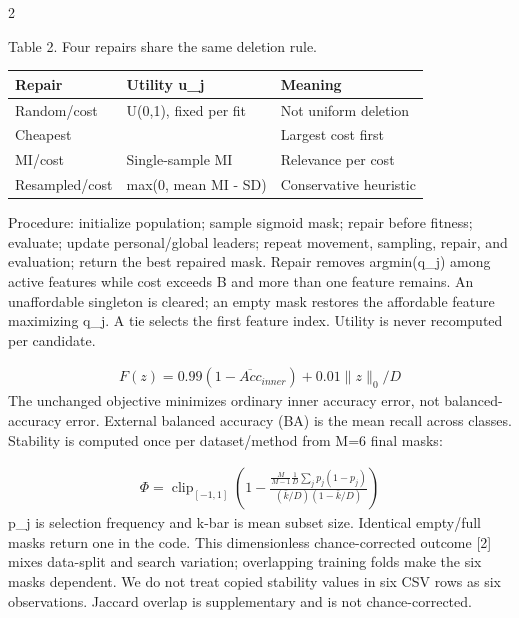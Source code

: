 \documentclass[10pt,a4paper]{article}
\begin{document}
\begin{multicols}{2}
\par\vspace{3pt}\begin{minipage}{\linewidth}{\footnotesize Table 2. Four repairs share the same deletion rule.\par}
{\fontsize{6.8}{8.3}\selectfont\setlength{\tabcolsep}{2pt}\renewcommand{\arraystretch}{1.1}
\begin{tabularx}{\linewidth}{>{\hsize=1.0000\hsize\raggedright\arraybackslash}X>{\hsize=1.0000\hsize\raggedright\arraybackslash}X>{\hsize=1.0000\hsize\raggedright\arraybackslash}X}\toprule
Repair & Utility u\_j & Meaning\\\midrule
Random/cost & U(0,1), fixed per fit & Not uniform deletion\\
Cheapest & 1 & Largest cost first\\
MI/cost & Single-sample MI & Relevance per cost\\
Resampled/cost & max(0, mean MI - SD) & Conservative heuristic\\
\bottomrule\end{tabularx}}
\end{minipage}\par\vspace{3pt}
Procedure: initialize population; sample sigmoid mask; repair before fitness; evaluate; update personal/global leaders; repeat movement, sampling, repair, and evaluation; return the best repaired mask. Repair removes argmin(q\_j) among active features while cost exceeds B and more than one feature remains. An unaffordable singleton is cleared; an empty mask restores the affordable feature maximizing q\_j. A tie selects the first feature index. Utility is never recomputed per candidate.

\begin{equation}\begin{gathered}F(z)=0.99(1-\overline{Acc}_{inner})+0.01\|z\|_0/D\end{gathered}\end{equation}
The unchanged objective minimizes ordinary inner accuracy error, not balanced-accuracy error. External balanced accuracy (BA) is the mean recall across classes. Stability is computed once per dataset/method from M=6 final masks:

\begin{equation}\begin{gathered}\Phi=\operatorname{clip}_{[-1,1]}\left(1-\frac{\frac{M}{M-1}\frac{1}{D}\sum_j p_j(1-p_j)}{(\bar k/D)(1-\bar k/D)}\right)\end{gathered}\end{equation}
p\_j is selection frequency and k-bar is mean subset size. Identical empty/full masks return one in the code. This dimensionless chance-corrected outcome [2] mixes data-split and search variation; overlapping training folds make the six masks dependent. We do not treat copied stability values in six CSV rows as six observations. Jaccard overlap is supplementary and is not chance-corrected.


\end{multicols}
\end{document}
